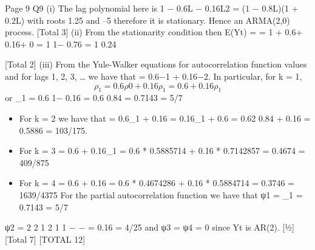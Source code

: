 \documentclass[a4paper,12pt]{article}
\begin{document}
  Page 9
  Q9 (i) The lag polynomial here is 1 − 0.6L − 0.16L2 = (1 − 0.8L)(1 + 0.2L) with roots
  1.25 and –5 therefore it is stationary. 
  Hence an ARMA(2,0) process. 
  [Total 3]
  (ii) From the stationarity condition then
  E(Yt) = \mu = 1 + 0.6\mu + 0.16\mu + 0 
  \mu = 1
  1− 0.76
  = 1
  0.24
  
  [Total 2]
  (iii) From the Yule-Walker equations for autocorrelation function values and for
  lags 1, 2, 3, … we have that \rhok = 0.6\rhok−1 + 0.16\rhok−2. 
  In particular, for k = 1,
  \[\rho_1 = 0.6\rho0 + 0.16\rho_1 = 0.6 + 0.16\rho_1\]
  or \rho_1 =
    0.6
  1− 0.16 =
    0.6
  0.84 = 0.7143 = 5/7 
  \begin{itemize}
\item  For k = 2 we have that
   = 0.6\rho_1 + 0.16 = 0.16\rho_1 + 0.6 =
    0.62
  0.84 + 0.16
  = 0.5886 = 103/175. 
\item  For k = 3
   = 0.6 + 0.16\rho_1 = 0.6 * 0.5885714 + 0.16 * 0.7142857
  = 0.4674 = 409/875 
\item  For k = 4
   = 0.6 + 0.16 = 0.6 * 0.4674286 + 0.16 * 0.5884714
  = 0.3746 = 1639/4375 
  For the partial autocorrelation function we have that
  ψ1 = \rho_1 = 0.7143 = 5/7 
\end{itemize}  
  ψ2 =
    2
  2 1
  2
  1 1
  \rho − \rho
  − \rho
  = 0.16 = 4/25 
  and ψ3 = ψ4 = 0 since Yt is AR(2). [½]
  [Total 7]
  [TOTAL 12]
  
\end{document}
